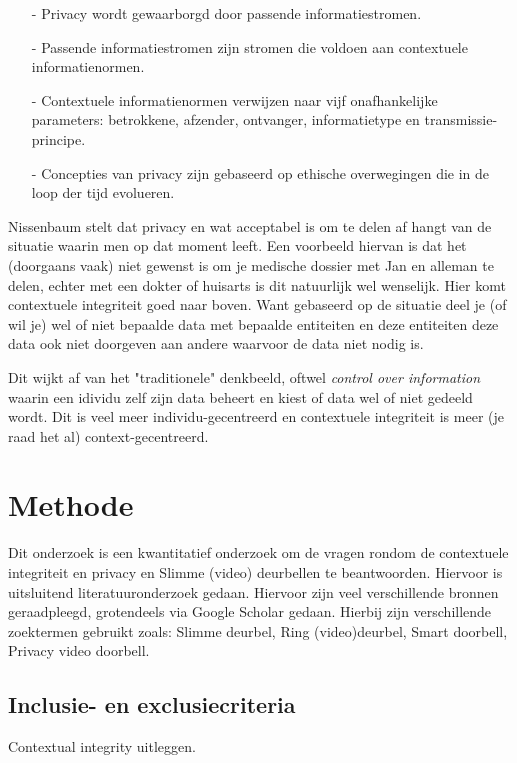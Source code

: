 \documentclass[nonacm,sigconf]{acmart}
\newcommand{\vertspace}{\vspace{0.05in}}
\begin{document}
    \vertspace
    \begin{itemize}[leftmargin = *,listparindent =1cm]
        \item[-] Privacy wordt gewaarborgd door passende informatiestromen.
        \item[-] Passende informatiestromen zijn stromen die voldoen aan contextuele informatienormen.
        \item[-] Contextuele informatienormen verwijzen naar vijf onafhankelijke parameters: betrokkene, afzender, ontvanger, informatietype en transmissie-principe.
        \item[-] Concepties van privacy zijn gebaseerd op ethische overwegingen die in de loop der tijd evolueren.
    \end{itemize}
    \vertspace

    Nissenbaum stelt dat privacy en wat acceptabel is om te delen af hangt van de situatie waarin men op dat moment leeft.
    Een voorbeeld hiervan is dat het (doorgaans vaak) niet gewenst is om je medische dossier met Jan en alleman te delen, echter met een dokter of huisarts is dit natuurlijk wel wenselijk.
    Hier komt contextuele integriteit goed naar boven.
    Want gebaseerd op de situatie deel je (of wil je) wel of niet bepaalde data met bepaalde entiteiten en deze entiteiten deze data ook niet doorgeven aan andere waarvoor de data niet nodig is.

    Dit wijkt af van het "traditionele" denkbeeld, oftwel \textit{control over information} waarin een idividu zelf zijn data beheert en kiest of data wel of niet gedeeld wordt.
    Dit is veel meer individu-gecentreerd en contextuele integriteit is meer (je raad het al) context-gecentreerd.

    \section{Methode}
    Dit onderzoek is een kwantitatief onderzoek om de vragen rondom de contextuele integriteit en privacy en Slimme (video) deurbellen te beantwoorden.
    Hiervoor is uitsluitend literatuuronderzoek gedaan.
    Hiervoor zijn veel verschillende bronnen geraadpleegd, grotendeels via Google Scholar gedaan.
    Hierbij zijn verschillende zoektermen gebruikt zoals: Slimme deurbel, Ring (video)deurbel, Smart doorbell, Privacy video doorbell.

    \subsection{Inclusie- en exclusiecriteria}
    Contextual integrity uitleggen.
\end{document}
